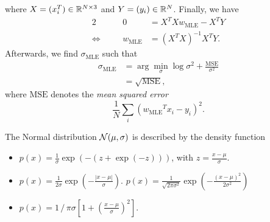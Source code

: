 \documentclass[11pt, a4paper]{article}
\begin{document}
\begin{enumerate}
\begin{solution}
        where $X = (x_i^T) \in \mathbb{R}^{N \times 3}$ and $Y = (y_i) \in \mathbb{R}^{N}$. Finally, we have
        \begin{alignat*}{2}
            && 0 & = X^T X w_{\text{MLE}} - X^T Y \\
            \Leftrightarrow \quad && w_{\text{MLE}} & = (X^T X)^{-1} X^T Y .
        \end{alignat*}
        Afterwards, we find $\sigma_{\text{MLE}}$ such that
        \begin{align*}
            \sigma_{\text{MLE}} & = \arg \min_\sigma \log \sigma^2 + \frac{\text{MSE}}{\sigma^2} \\
            & = \sqrt{\text{MSE}},
        \end{align*}
        where $\text{MSE}$ denotes the \emph{mean squared error}
        \begin{equation*}
            \frac{1}{N} \sum_i ({w_{\text{MLE}}}^T x_i - y_i)^2 .
        \end{equation*}
    \end{solution}
\end{enumerate}

\newpage

\startquiz

The Normal distribution ${\cal N}(\mu,\sigma)$ is described by the density function
\begin{itemize}
\item $p(x) = \frac{1}{\sigma} \exp\left(-(z+\exp(-z))\right)$, with $z = \frac{x-\mu}{\sigma}$.
\item $p(x) = \frac{1}{2\sigma} \exp\left(-\frac{|x-\mu|}{\sigma}\right)$.
\solitem $p(x) = \frac{1}{\sqrt{2\pi\sigma^2}} \exp\left(-\frac{(x-\mu)^2}{2\sigma^2}\right)$
\item $p(x) = 1 \,/\, \pi\sigma \left[1 + \left(\frac{x-\mu}{\sigma}\right)^2\right]$.
\end{itemize}
\end{document}
